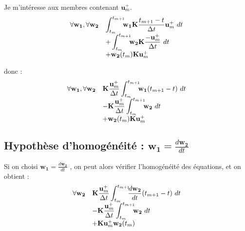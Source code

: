 \documentclass[12pt,a4paper]{report}
\begin{document}
Je m'intéresse aux membres contenant $\mathbf{u}_m^+$.
\begin{equation}
\begin{array}{r l}
	\forall \mathbf{w_1},\forall \mathbf{w_2}
	&\displaystyle
	 \int_{t_m}^{t_{m+1}} \!\!\! 	\mathbf{w_1}
		\mathbf{K}
			\frac{t_{m+1}-t}{\Delta t} \mathbf{u}_m^+ ~dt
	\\
	  &\displaystyle	
	   + \int_{t_m}^{t_{m+1}} \!\!\! 
	    	\mathbf{w_2} \mathbf{K} 
	    			\frac{ - \mathbf{u}_m^+ }{\Delta t}	~dt 
	\\
	  &+ \mathbf{w_2}(t_m) \mathbf{K} \mathbf{u}_m^+ 
\end{array}
\end{equation}

donc :
\begin{equation}
\begin{array}{r l}
	\forall \mathbf{w_1},\forall \mathbf{w_2}
	&\displaystyle
	 \mathbf{K} \frac{\mathbf{u}_m^+}{\Delta t} 
	 	\int_{t_m}^{t_{m+1}} \!\!\! \mathbf{w_1}		
			(t_{m+1}-t) ~dt
	\\
	  &\displaystyle	
	   - \mathbf{K} \frac{ \mathbf{u}_m^+ }{\Delta t}
	   		\int_{t_m}^{t_{m+1}} \!\!\!  \mathbf{w_2} 	~dt 
	\\
	  &+ \mathbf{w_2}(t_m) \mathbf{K} \mathbf{u}_m^+ 
\end{array}
\end{equation}

\subsection{Hypothèse d'homogénéité : $\displaystyle \mathbf{w_1} = \frac{d\mathbf{w_2}}{dt}$}
Si on choisi $\displaystyle \mathbf{w_1} = \frac{d\mathbf{w_2}}{dt}$ , on peut alors vérifier l'homogénéité des équations, et on obtient :
\begin{equation}
\begin{array}{r l}
	\forall \mathbf{w_2}
	&\displaystyle
	 \mathbf{K} \frac{\mathbf{u}_m^+}{\Delta t} 
	 	\int_{t_m}^{t_{m+1}} \!\!\! \frac{d\mathbf{w_2}}{dt}		
			(t_{m+1}-t) ~dt
	\\
	  &\displaystyle	
	   - \mathbf{K} \frac{ \mathbf{u}_m^+ }{\Delta t}
	   		\int_{t_m}^{t_{m+1}} \!\!\!  \mathbf{w_2} 	~dt 
	\\
	  &+ \mathbf{K} \mathbf{u}_m^+  \mathbf{w_2}(t_m)
\end{array}
\end{equation}
\end{document}
